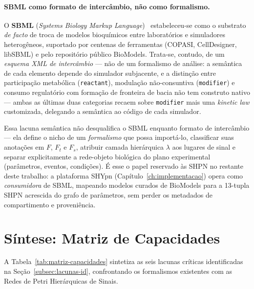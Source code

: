 \paragraph{SBML como formato de intercâmbio, não como formalismo.}
O \textbf{SBML} (\textit{Systems Biology Markup Language})~\cite{Hucka2003}
estabeleceu-se como o substrato \emph{de facto} de troca de modelos
bioquímicos entre laboratórios e simuladores heterogêneos, suportado por
centenas de ferramentas (COPASI, CellDesigner, libSBML) e pelo repositório
público BioModels. Trata-se, contudo, de um \emph{esquema XML de
intercâmbio} --- não de um formalismo de análise: a semântica de cada
elemento depende do simulador subjacente, e a distinção entre
participação metabólica (\texttt{reactant}), modulação não-consuntiva
(\texttt{modifier}) e consumo regulatório com formação de fronteira de
bacia não tem construto nativo --- ambas as últimas duas categorias
recaem sobre \texttt{modifier} mais uma \textit{kinetic law} customizada,
delegando a semântica ao código de cada simulador.

Essa lacuna semântica não desqualifica o SBML enquanto formato de
intercâmbio --- ela define o nicho de um \emph{formalismo} que possa
importá-lo, classificar suas anotações em $F$, $F_t$ e $F_s$, atribuir
camada hierárquica $\lambda$ aos lugares de sinal e separar
explicitamente a rede-objeto biológica do plano experimental
(parâmetros, eventos, condições). É esse o papel reservado às SHPN no
restante deste trabalho: a plataforma SHYpn (Capítulo~\ref{ch:implementacao})
opera como \emph{consumidora} de SBML, mapeando modelos curados de
BioModels para a 13-tupla SHPN acrescida do grafo de parâmetros, sem
perder os metadados de compartimento e proveniência.

\section{Síntese: Matriz de Capacidades}
\label{sec:lacunas}

A Tabela~\ref{tab:matriz-capacidades} sintetiza as seis lacunas críticas
identificadas na Seção~\ref{subsec:lacunas-id}, confrontando os formalismos
existentes com as Redes de Petri Hierárquicas de Sinais.

